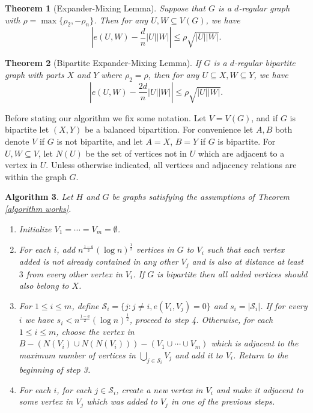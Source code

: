 \documentclass[12pt]{article}%
\newtheorem{theorem}{Theorem}[section]
\newtheorem{algorithm}[theorem]{Algorithm}
\begin{document}
 \begin{theorem}[Expander-Mixing Lemma] \label{expander mixing lemma} 
 Suppose that $G$ is a $d$-regular graph with $\rho = \max\{\rho_2, -\rho_n\}$. Then for any $U,W\subseteq V(G)$, we have
 $$\left|e(U,W)-\frac{d}{n}|U||W|\right|\le\rho\sqrt{|U||W|}.$$
 \end{theorem}


 

\begin{theorem}[Bipartite Expander-Mixing Lemma] \label{expander mixing lemma bipartite}
If $G$ is a $d$-regular bipartite graph with parts $X$ and $Y$ where $\rho_2 = \rho$, then for any $U\subseteq X,W\subseteq Y$, we have
$$\left|e(U,W)-\frac{2d}{n}|U||W|\right|\le\rho\sqrt{|U||W|}.$$
\end{theorem}

Before stating our algorithm we fix some notation. Let $V=V(G)$, and if $G$ is bipartite let $(X,Y)$ be a balanced bipartition. For convenience let $A,B$ both denote $V$ if $G$ is not bipartite, and let $A=X$, $B=Y$ if $G$ is bipartite. For $U,W\subseteq V$, let $N(U)$ be the set of vertices not in $U$ which are adjacent to a vertex in $U$. Unless otherwise indicated, all vertices and adjacency relations are within the graph $G$.

\begin{algorithm} \label{algorithm description} Let $H$ and $G$ be graphs satisfying the assumptions of Theorem \ref{algorithm works}.
    \begin{enumerate}
        \item Initialize $V_1=\cdots=V_m=\emptyset$.
        \item For each $i$, add $n^{\frac{1-a}{2}}(\log n)^{\frac{1}{2}}$ vertices in $G$ to $V_i$ such that each vertex added is not already contained in any other $V_j$ and is also at distance at least $3$ from every other vertex in $V_i$. If $G$ is bipartite then all added vertices should also belong to $X$.
        \item For $1\le i\le m$, define $\mathcal S_i=\{j:j\ne i,e(V_i,V_j)=0\}$ and $s_i=|\mathcal S_i|$. If for every $i$ we have $s_i<n^{\frac{1-a}{2}}(\log n)^{\frac{1}{2}}$, proceed to step 4. Otherwise, for each $1\le i\le m$, choose the vertex in $B-(N(V_i)\cup N(N(V_i)))-(V_1\cup\cdots\cup V_m)$ which is adjacent to the maximum number of vertices in $\bigcup_{j\in\mathcal S_i}V_j$ and add it to $V_i$. Return to the beginning of step 3.
        \item For each $i$, for each $j\in\mathcal S_i$, create a new vertex in $V_i$ and make it adjacent to some vertex in $V_j$ which was added to $V_j$ in one of the previous steps.
\end{enumerate}
\end{algorithm}
\end{document}
